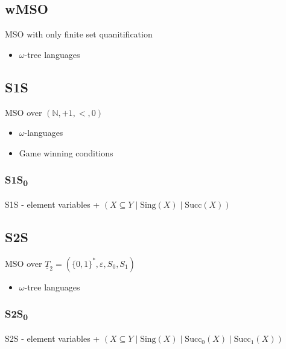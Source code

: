 \documentclass{article}
\begin{document}
\subsection{wMSO}
MSO with only finite set quanitification

\begin{itemize}
	\item $\omega$-tree languages
\end{itemize}

\subsection{S1S}
MSO over $(\mathbb{N}, +1, <, 0)$

\begin{itemize}
	\item $\omega$-languages
	\item Game winning conditions
\end{itemize}

\subsubsection*{S1S\textsubscript{0}}
S1S - element variables + $(X \subseteq Y \mid \text{Sing}(X) \mid \text{Succ}(X))$

\subsection{S2S}
MSO over $\underline{T}_2 = (\{0, 1\}^*, \varepsilon, S_0, S_1)$

\begin{itemize}
	\item $\omega$-tree languages
\end{itemize}

\subsubsection*{S2S\textsubscript{0}}
S2S - element variables + $(X \subseteq Y \mid \text{Sing}(X) \mid \text{Succ}_0(X) \mid \text{Succ}_1(X))$
\end{document}
